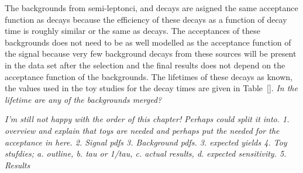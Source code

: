 {The backgrounds from semi-leptonci, \bhh and \bdmumu decays are asigned the same acceptance function as \bsmumu decays because the efficiency of these decays as a function of decay time is roughly similar or the same as \bsmumu decays. The acceptances of these backgrounds does not need to be as well modelled as the acceptance function of the signal because very few background decays from these sources will be present in the data set after the selection and the final results does not depend on the acceptance function of the backgrounds. The lifetimes of these decays as known, the values used in the toy studies for the decay times \pdfs are given in Table~\ref{}. {\it In the lifetime are any of the backgrounds merged?}

{\it I'm still not happy with the order of this chapter! Perhaps could split it into. 1. overview and explain that toys are needed and perhaps put the needed for the acceptance in here. 2. Signal pdfs 3. Background pdfs. 3. expected yields 4. Toy stufdies; a. outline, b. tau or 1/tau, c. actual results, d. expected sensitivity. 5. Results}


}
